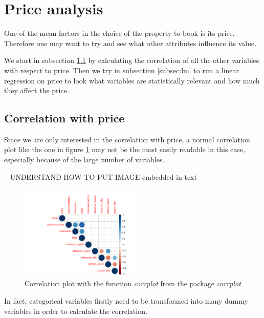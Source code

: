 \section{Price analysis}\label{Sec:Price analysis}

One of the mean factors in the choice of the property to book is its price. Therefore one may want to try and see what other attributes influence its value.

We start in subsection \ref{subsec:corr} by calculating the correlation of all the other variables with respect to price. Then we try in subsection \ref{subsec:lm} to run a linear regression on price to look what variables are statistically relevant and how much they affect the price.


\subsection{Correlation with price}\label{subsec:corr}


Since we are only interested in the correlation with price, a normal correlation plot like the one in figure \ref{figure:corrplot} may not be the most easily readable in this case, especially because of the large number of variables.

-- UNDERSTAND HOW TO PUT IMAGE embedded in text

\begin{figure}[H]
\begin{center}
\includegraphics[width=0.5\textwidth]{corrplot.pdf}
\caption{Correlation plot with the function  \textit{corrplot} from the package \textit{corrplot} }
\label{figure:corrplot}
\end{center}
\end{figure}

In fact, categorical variables firstly need to be transformed into many dummy variables in order to calculate the correlation.




